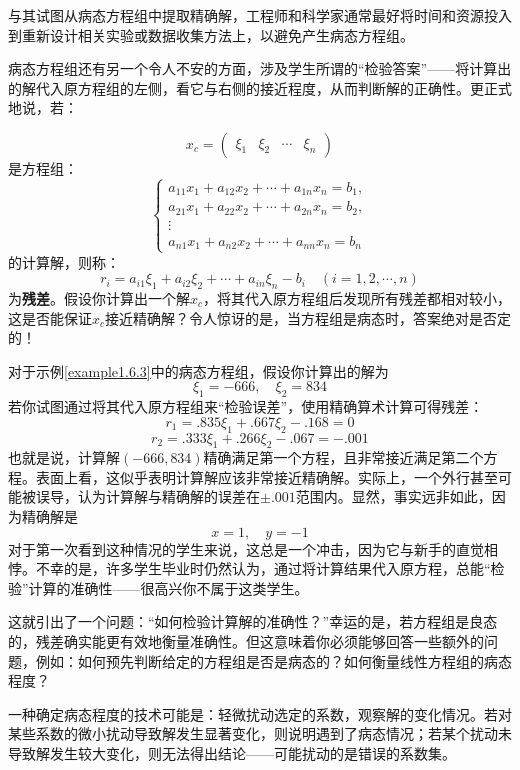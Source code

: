 与其试图从病态方程组中提取精确解，工程师和科学家通常最好将时间和资源投入到重新设计相关实验或数据收集方法上，以避免产生病态方程组。

病态方程组还有另一个令人不安的方面，涉及学生所谓的“检验答案”——将计算出的解代入原方程组的左侧，看它与右侧的接近程度，从而判断解的正确性。更正式地说，若：

$$
x_c = \left(\begin{array}{llll} 
\xi_1 & \xi_2 & \cdots & \xi_n
\end{array}\right)
$$
是方程组：
$$
\begin{cases} 
a_{11}x_1 + a_{12}x_2 + \cdots + a_{1n}x_n = b_1, \\
a_{21}x_1 + a_{22}x_2 + \cdots + a_{2n}x_n = b_2, \\
\vdots \\
a_{n1}x_1 + a_{n2}x_2 + \cdots + a_{nn}x_n = b_n
\end{cases}
$$
的计算解，则称：
$$
r_i = a_{i1}\xi_1 + a_{i2}\xi_2 + \cdots + a_{in}\xi_n - b_i \quad (i = 1, 2, \cdots, n)
$$
为\textbf{残差}。假设你计算出一个解$x_c$，将其代入原方程组后发现所有残差都相对较小，这是否能保证$x_c$接近精确解？令人惊讶的是，当方程组是病态时，答案绝对是否定的！

\begin{example}
\label{example1.6.3}
对于示例\ref{example1.6.3}中的病态方程组，假设你计算出的解为
$$\xi_1 = -666, \quad \xi_2 = 834$$
若你试图通过将其代入原方程组来“检验误差”，使用精确算术计算可得残差：
$$
r_1 = .835\xi_1 + .667\xi_2 - .168 = 0
$$
$$
r_2 = .333\xi_1 + .266\xi_2 - .067 = -.001
$$
也就是说，计算解$(-666, 834)$精确满足第一个方程，且非常接近满足第二个方程。表面上看，这似乎表明计算解应该非常接近精确解。实际上，一个外行甚至可能被误导，认为计算解与精确解的误差在$\pm .001$范围内。显然，事实远非如此，因为精确解是
$$
x = 1, \quad y = -1
$$
对于第一次看到这种情况的学生来说，这总是一个冲击，因为它与新手的直觉相悖。不幸的是，许多学生毕业时仍然认为，通过将计算结果代入原方程，总能“检验”计算的准确性——很高兴你不属于这类学生。
\end{example}

这就引出了一个问题：“如何检验计算解的准确性？”幸运的是，若方程组是良态的，残差确实能更有效地衡量准确性。但这意味着你必须能够回答一些额外的问题，例如：如何预先判断给定的方程组是否是病态的？如何衡量线性方程组的病态程度？

一种确定病态程度的技术可能是：轻微扰动选定的系数，观察解的变化情况。若对某些系数的微小扰动导致解发生显著变化，则说明遇到了病态情况；若某个扰动未导致解发生较大变化，则无法得出结论——可能扰动的是错误的系数集。

